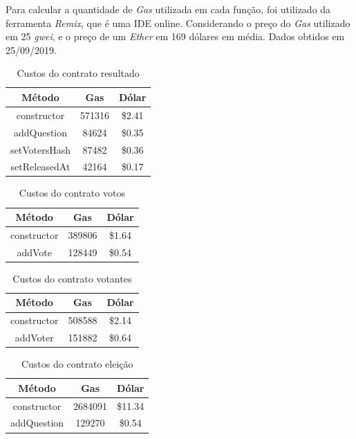 \documentclass{ufsctex/ufsctex}
\begin{document}
Para calcular a quantidade de \textit{Gas} utilizada em cada função, foi
utilizado da ferramenta \textit{Remix}, que é uma IDE online. Considerando o
preço do \textit{Gas} utilizado em 25 \textit{gwei}, e o preço de um
\textit{Ether} em 169 dólares em média. Dados obtidos em 25/09/2019.

\begin{table}[htb]
\centering
\begin{tabular}{||c|c|c||}
\hline
	\textbf{Método}        & \textbf{Gas}    & \textbf{Dólar}  \\  [0.2ex] \hline \hline
constructor   & 571316 & \$2.41 \\
addQuestion   & 84624  & \$0.35 \\ 
setVotersHash & 87482  & \$0.36 \\ 
setReleasedAt & 42164  & \$0.17 \\ \hline
\end{tabular}
\caption{Custos do contrato resultado}
\label{tab:my-table}
\end{table}

\begin{table}[htb]
\centering
\begin{tabular}{||c|c|c||}
		\hline
		\textbf{Método} & \textbf{Gas} & \textbf{Dólar}  \\ [0.2ex] \hline \hline
		constructor & 389806 & \$1.64 \\ 
		addVote     & 128449 & \$0.54 \\ \hline
	\end{tabular}
	\caption{Custos do contrato votos}
	\label{tab:my-table}
\end{table}

\begin{table}[htb]
	\centering
	\begin{tabular}{||c|c|c||}
		\hline
		\textbf{Método}  & \textbf{Gas} & \textbf{Dólar}  \\ [0.2ex] \hline \hline
		constructor & 508588 & \$2.14 \\ 
		addVoter    & 151882 & \$0.64 \\ \hline
	\end{tabular}
	\caption{Custos do contrato votantes}
	\label{tab:my-table}
\end{table}

\begin{table}[htb]
	\centering
	\begin{tabular}{||c|c|c||}
		\hline
		\textbf{Método} & \textbf{Gas}  & \textbf{Dólar}   \\ [0.2ex] \hline \hline
		constructor & 2684091 & \$11.34 \\ 
		addQuestion & 129270  & \$0.54  \\ \hline
	\end{tabular}
	\caption{Custos do contrato eleição}
	\label{tab:my-table}
\end{table}
\end{document}
